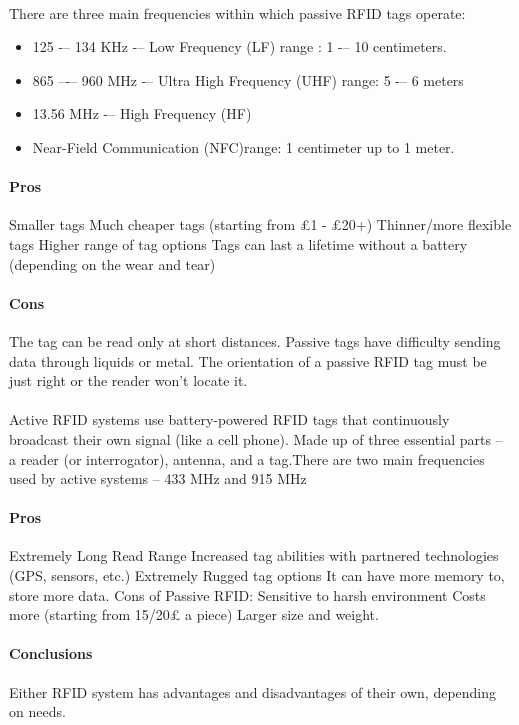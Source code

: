 \documentclass[12pt,a4paper]{article}
\begin{document}
\begin{appendices}
      \paragraph{}
        There are three main frequencies within which passive RFID tags operate: 
        \begin{itemize}
          \item 125 -– 134 KHz -– Low Frequency (LF) range : 1 -– 10 centimeters. 
          \item 865 –-– 960 MHz -– Ultra High Frequency (UHF) range: 5 -– 6 meters
          \item 13.56 MHz -– High Frequency (HF)
          \item Near-Field Communication (NFC)range: 1 centimeter up to 1 meter. 
        \end{itemize}
      \paragraph{Pros}
        Smaller tags Much cheaper tags (starting from £1 - £20+) Thinner/more flexible tags Higher range of tag options Tags can last a lifetime without a battery (depending on the wear and tear)
      \paragraph{Cons}
        The tag can be read only at short distances. Passive tags have difficulty sending data through liquids or metal. The orientation of a passive RFID tag must be just right or the reader won't locate it.
      \paragraph{}
        Active RFID systems use battery-powered RFID tags that continuously broadcast their own signal (like a cell phone). Made up of three essential parts – a reader (or interrogator), antenna, and a tag.There are two main frequencies used by active systems – 433 MHz and 915 MHz
      \paragraph{Pros}
        Extremely Long Read Range Increased tag abilities with partnered technologies (GPS, sensors, etc.) Extremely Rugged tag options It can have more memory to, store more data. Cons of Passive RFID: Sensitive to harsh environment Costs more (starting from 15/20£ a piece) Larger size and weight.
      \paragraph{Conclusions}
        Either RFID system has advantages and disadvantages of their own, depending on needs.

\end{appendices}
\end{document}
